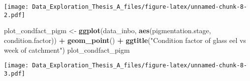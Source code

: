 \documentclass[]{article}
\newenvironment{Shaded}{\begin{snugshade}}{\end{snugshade}}
\newcommand{\KeywordTok}[1]{\textcolor[rgb]{0.13,0.29,0.53}{\textbf{#1}}}
\newcommand{\StringTok}[1]{\textcolor[rgb]{0.31,0.60,0.02}{#1}}
\newcommand{\OperatorTok}[1]{\textcolor[rgb]{0.81,0.36,0.00}{\textbf{#1}}}
\newcommand{\NormalTok}[1]{#1}
\begin{document}
\texttt{[image: Data\_Exploration\_Thesis\_A\_files/figure-latex/unnamed-chunk-8-2.pdf]}

\begin{Shaded}
\begin{Highlighting}[]
\NormalTok{plot_condfact_pigm <-}\StringTok{ }\KeywordTok{ggplot}\NormalTok{(data_inbo, }\KeywordTok{aes}\NormalTok{(pigmentation.stage, condition.factor)) }\OperatorTok{+}
\StringTok{  }\KeywordTok{geom_point}\NormalTok{() }\OperatorTok{+}
\StringTok{  }\KeywordTok{ggtitle}\NormalTok{(}\StringTok{"Condition factor of glass eel vs week of catchment"}\NormalTok{) }
\NormalTok{plot_condfact_pigm}
\end{Highlighting}
\end{Shaded}

\texttt{[image: Data\_Exploration\_Thesis\_A\_files/figure-latex/unnamed-chunk-8-3.pdf]}
\end{document}

